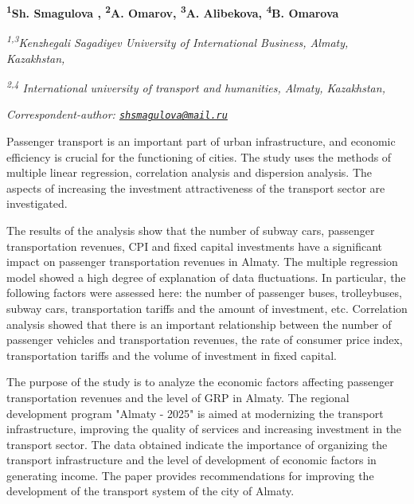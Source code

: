 
\begin{articleheader}

{\bfseries  
\textsuperscript{1}Sh. Smagulova\textsuperscript{\envelope } ,
\textsuperscript{2}A. Omarov,
\textsuperscript{3}A. Alibekova,
\textsuperscript{4}B. Omarova}
\end{articleheader}

\begin{affiliation}
\textsuperscript{\emph{1,3}}\emph{Kenzhegali Sagadiyev University of International Business, Almaty, Kazakhstan,}

\emph{\textsuperscript{2,4} International university of transport and humanities, Almaty, Kazakhstan,}

\raggedright \textsuperscript{\envelope }{\em Correspondent-author: \href{mailto:shsmagulova@mail.ru}{\nolinkurl{shsmagulova@mail.ru}}}
\end{affiliation}

Passenger transport is an important part of urban infrastructure, and
economic efficiency is crucial for the functioning of cities. The study
uses the methods of multiple linear regression, correlation analysis and
dispersion analysis. The aspects of increasing the investment
attractiveness of the transport sector are investigated.

The results of the analysis show that the number of subway cars,
passenger transportation revenues, CPI and fixed capital investments
have a significant impact on passenger transportation revenues in
Almaty. The multiple regression model showed a high degree of
explanation of data fluctuations. In particular, the following factors
were assessed here: the number of passenger buses, trolleybuses, subway
cars, transportation tariffs and the amount of investment, etc.
Correlation analysis showed that there is an important relationship
between the number of passenger vehicles and transportation revenues,
the rate of consumer price index, transportation tariffs and the volume
of investment in fixed capital.

The purpose of the study is to analyze the economic factors affecting
passenger transportation revenues and the level of GRP in Almaty. The
regional development program "Almaty - 2025" is aimed at modernizing the
transport infrastructure, improving the quality of services and
increasing investment in the transport sector. The data obtained
indicate the importance of organizing the transport infrastructure and
the level of development of economic factors in generating income. The
paper provides recommendations for improving the development of the
transport system of the city of Almaty.

